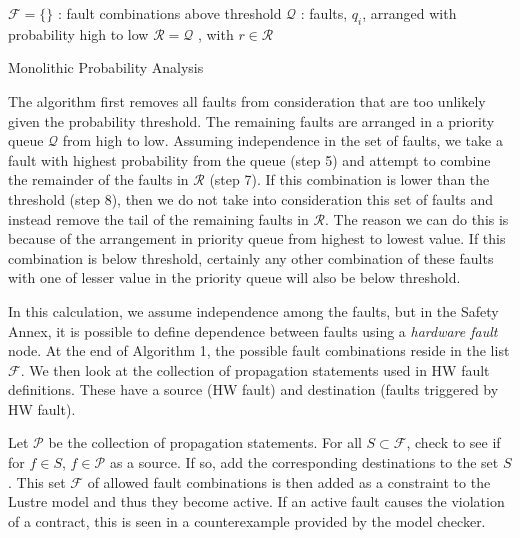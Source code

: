 \begin{algorithm}[H]
 $\mathcal{F} = \{\}$ : fault combinations above threshold \;
 $\mathcal{Q}$ : faults, $q_i$, arranged with probability high to low \;
 $\mathcal{R} = \mathcal{Q}$ , with $r \in \mathcal{R}$\;
 \caption{Monolithic Probability Analysis}
\end{algorithm}

The algorithm first removes all faults from consideration that are too unlikely given the probability threshold. The remaining faults are arranged in a priority queue $\mathcal{Q}$ from high to low. Assuming independence in the set of faults, we take a fault with highest probability from the queue (step 5) and attempt to combine the remainder of the faults in $\mathcal{R}$ (step 7). If this combination is lower than the threshold (step 8), then we do not take into consideration this set of faults and instead remove the tail of the remaining faults in $\mathcal{R}$. The reason we can do this is because of the arrangement in priority queue from highest to lowest value. If this combination is below threshold, certainly any other combination of these faults with one of lesser value in the priority queue will also be below threshold. 
 
In this calculation, we assume independence among the faults, but in the Safety Annex, it is possible to define dependence between faults using a \textit{hardware fault} node. At the end of Algorithm 1, the possible fault combinations reside in the list $\mathcal{F}$. We then look at the collection of propagation statements used in HW fault definitions. These have a source (HW fault) and destination (faults triggered by HW fault). 

Let $\mathcal{P}$ be the collection of propagation statements. For all $S \subset \mathcal{F}$, check to see if for $f \in S$, $f \in \mathcal{P}$ as a source. If so, add the corresponding destinations to the set $S$. This set $\mathcal{F}$ of allowed fault combinations is then added as a constraint to the Lustre model and thus they become active. If an active fault causes the violation of a contract, this is seen in a counterexample provided by the model checker.

